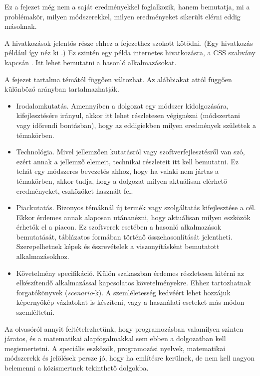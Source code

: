 

Ez a fejezet még nem a saját eredményekkel foglalkozik, hanem bemutatja, mi a problémakör, milyen módszerekkel, milyen eredményeket sikerült elérni eddig másoknak.

A hivatkozások jelentős része ehhez a fejezethez szokott kötődni.
(Egy hivatkozás például így néz ki \cite{coombs1987markup}.)
Ez szintén egy példa internetes hivatkozásra, a CSS szabvány kapcsán \cite{css}.
Itt lehet bemutatni a hasonló alkalmazásokat.


A fejezet tartalma témától függően változhat. Az alábbiakat attól függően különböző arányban tartalmazhatják.
\begin{itemize}
\item Irodalomkutatás. Amennyiben a dolgozat egy módszer kidolgozására, kifejlesztésére irányul, akkor itt lehet részletesen végignézni (módszertani vagy időrendi bontásban), hogy az eddigiekben milyen eredmények születtek a témakörben.
\item Technológia. Mivel jellemzően kutatásról vagy szoftverfejlesztésről van szó, ezért annak a jellemző elemeit, technikai részleteit itt kell bemutatni.
Ez tehát egy módszeres bevezetés ahhoz, hogy ha valaki nem jártas a témakörben, akkor tudja, hogy a dolgozat milyen aktuálisan elérhető eredményeket, eszközöket használt fel.
\item Piackutatás. Bizonyos témáknál új termék vagy szolgáltatás kifejlesztése a cél.
Ekkor érdemes annak alaposan utánanézni, hogy aktuálisan milyen eszközök érhetők el a piacon.
Ez szoftverek esetében a hasonló alkalmazások bemutatását, táblázatos formában történő összehasonlítását jelentheti.
Szerepelhetnek képek és észrevételek a viszonyításként bemutatott alkalmazásokhoz.
\item Követelmény specifikáció. Külön szakaszban érdemes részletesen kitérni az elkészítendő alkalmazással kapcsolatos követelményekre.
Ehhez tartozhatnak forgatókönyvek (\textit{scenario}-k).
A szemléletesség kedvéért lehet hozzájuk képernyőkép vázlatokat is készíteni, vagy a használati eseteket más módon szemléltetni.
\end{itemize}


Az olvasóról annyit feltételezhetünk, hogy programozásban valamilyen szinten járatos, és a matematikai alapfogalmakkal sem ebben a dolgozatban kell megismertetni.
A speciális eszközök, programozási nyelvek, matematikai módszerekk és jelölések persze jó, hogy ha említésre kerülnek, de nem kell nagyon belemenni a közismertnek tekinthető dolgokba.

